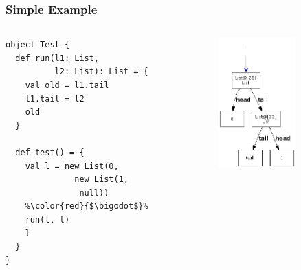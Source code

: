 \documentclass[hyperref={pdfpagelabels=false}]{beamer}
\begin{document}
\begin{frame}[fragile]
\frametitle{Simple Example}
  \begin{columns}
    \begin{column}{0.4\textwidth}
\begin{lstlisting}
object Test {
  def run(l1: List,
          l2: List): List = {
    val old = l1.tail
    l1.tail = l2
    old
  }

  def test() = {
    val l = new List(0,
              new List(1,
               null))
    %\color{red}{$\bigodot$}%
    run(l, l)
    l
  }
}
\end{lstlisting}
    \end{column}
    \begin{column}{0.6\textwidth}
      \begin{figure}[t]
        \includegraphics[height=50mm]{images/bef.png}\\
      \end{figure}
    \end{column}
  \end{columns}
\end{frame}
\end{document}
